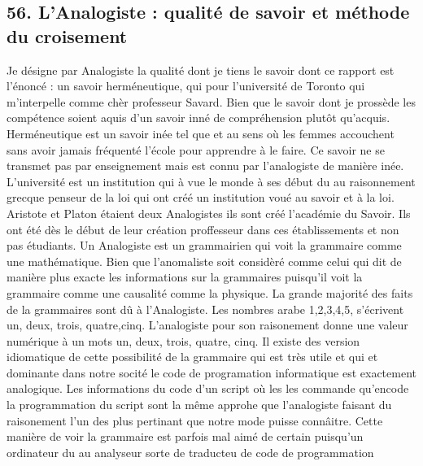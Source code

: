 \documentclass[12pt,letterpaper,oneside]{article}
\begin{document}
\subsection*{56. L’Analogiste : qualité de savoir et méthode du croisement}
Je désigne par Analogiste la qualité dont je tiens le savoir dont ce rapport est l’énoncé : un savoir herméneutique, qui pour l'université de Toronto qui m'interpelle comme chèr professeur Savard. Bien que le savoir dont je prossède les compétence soient aquis d'un savoir inné de compréhension plutôt qu’acquis. Herméneutique est un savoir inée tel que et au sens où les femmes accouchent sans avoir jamais fréquenté l’école pour apprendre à le faire. Ce savoir ne se transmet pas par enseignement mais est connu par l'analogiste de manière inée. L'université est un institution qui à vue le monde à ses début du au raisonnement grecque penseur de la loi qui ont créé un institution voué au savoir et à la loi. Aristote et Platon étaient deux Analogistes ils sont créé l'académie du Savoir. Ils ont été dès le début de leur création proffesseur dans ces établissements et non pas étudiants. Un Analogiste est un grammairien qui voit la grammaire
comme une mathématique. Bien que l'anomaliste soit considèré comme celui qui dit de manière plus exacte les informations sur la grammaires puisqu'il voit la grammaire comme une causalité comme la physique. La grande majorité des faits de la grammaires sont dû à l'Analogiste. Les nombres arabe 1,2,3,4,5, s'écrivent un, deux, trois, quatre,cinq. L'analogiste pour son raisonement donne une valeur numérique à un mots un, deux, trois, quatre, cinq. Il existe des version idiomatique de cette possibilité de la grammaire qui est très utile et qui et dominante dans notre socité le code de programation informatique est exactement analogique. Les informations du code d'un script où les les commande qu'encode la programmation du script sont la même approhe que l'analogiste faisant du raisonement l'un des plus pertinant que notre mode puisse connâitre. Cette manière de voir la grammaire est parfois mal aimé de certain puisqu'un ordinateur du au analyseur sorte de traducteu de code de programmation 
\end{document}
